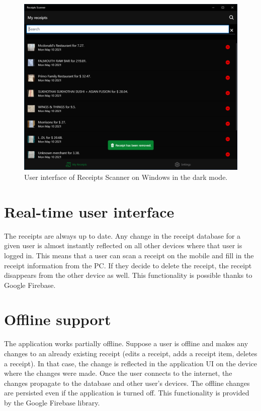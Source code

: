 \documentclass[
  digital, %
  table,   %
  oneside, %
  lof,     %
  lot,     %
]{fithesis3}
\begin{document}
\begin{figure}[H]
    \begin{center}
        \includegraphics[width=\textwidth]{figures/screens/windows/dark/remove_receipt_toast}
    \end{center}
    \caption{User interface of Receipts Scanner on Windows in the dark mode.}
    \label{fig:dark_mode_windows}
\end{figure}

\section{Real-time user interface}
The receipts are always up to date. Any change in the receipt database for a given user is almost instantly reflected on all other devices where that user is logged in. This means that a user can scan a receipt on the mobile and fill in the receipt information from the PC. If they decide to delete the receipt, the receipt disappears from the other device as well.
This functionality is possible thanks to Google Firebase.

\section{Offline support}
The application works partially offline. Suppose a user is offline and makes any changes to an already existing receipt (edits a receipt, adds a receipt item, deletes a receipt). In that case, the change is reflected in the application UI on the device where the changes were made. Once the user connects to the internet, the changes propagate to the database and other user's devices. The offline changes are persisted even if the application is turned off. This functionality is provided by the Google Firebase library.
\end{document}
